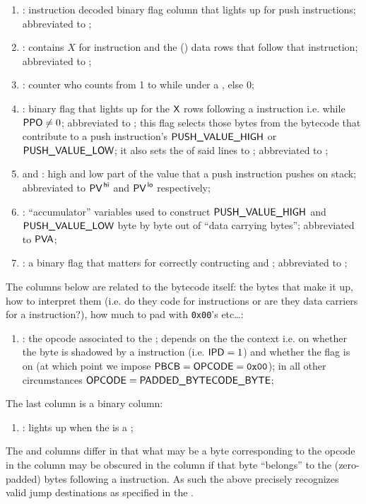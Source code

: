 \begin{enumerate}[resume]
    \item \IP{}:
	instruction decoded binary flag column that lights up for push instructions;
	abbreviated to \ip{};
    \item \PP{}:
	contains $X$ for  instruction and the () data rows that follow that instruction;
	abbreviated to \pp{};
    \item \CP{}:
	counter who counts from 1 to \PP{} while under a , else 0;
    \item \IPD{}:
	binary flag that lights up for the $\textsf{X}$ rows following a  instruction i.e. while $\textsf{PPO}{} \neq 0$;
	abbreviated to \ipd{};
	this flag selects those bytes from the bytecode that contribute to a push instruction's $\textsf{PUSH\_VALUE}\textsf{\_HIGH}$ or $\textsf{PUSH\_VALUE}\textsf{\_LOW}$;
	it also sets the \opc{} of said lines to ;
	abbreviated to \ipd{};
    \item \PV\HIGH{} and \PV\LOW{}:
	high and low part of the value that a push instruction pushes on stack;
	abbreviated to $\textsf{PV}^{\mathsf{\,hi}}$ and $\textsf{PV}^{\mathsf{\,lo}}$ respectively;
    \item \PVA:
	``accumulator'' variables used to construct $\textsf{PUSH\_VALUE}\textsf{\_HIGH}$ and $\textsf{PUSH\_VALUE}\textsf{\_LOW}$ byte by byte out of ``data carrying bytes'';
	abbreviated to $\textsf{PVA}$;
    \item \PFB{}:
	a binary flag that matters for correctly contructing \PV\HIGH{} and \PV\LOW{};
	abbreviated to \pfb{};
\end{enumerate}

The columns below are related to the bytecode itself: the bytes that make it up, how to interpret them (i.e. do they code for instructions or are they data carriers for a  instruction?), how much to pad with \texttt{0x00}'s etc\dots:
\begin{enumerate}[resume]
    \item \opc{}:
	the opcode associated to the \pbcb{};
	depends on the the context i.e. on whether the byte is shadowed by a  instruction (i.e. \( \textsf{IPD}{}=1 \)) and whether the \CSR{} flag is on (at which point we impose $\textsf{PBCB}=\textsf{OPCODE}=\texttt{0x00}$);
	in all other circumstances \( \textsf{OPCODE}{} = \textsf{PADDED\_BYTECODE\_BYTE}{} \);
\end{enumerate}

The last column is a binary column:
\begin{enumerate}[resume]
    \item \ISVALIDJUMPDESTINATION{}:
	lights up when the \opc{} is a ;
\end{enumerate}
\saNote{}
The \opc{} and \pbcb{} columns differ in that what may be a byte corresponding to the  opcode in the \pbcb{} column may be obscured in the \opc{} column if that byte ``belongs'' to the  (zero-padded) bytes following a  instruction.
As such the above precisely recognizes valid jump destinations as specified in the \cite{EYP}.

